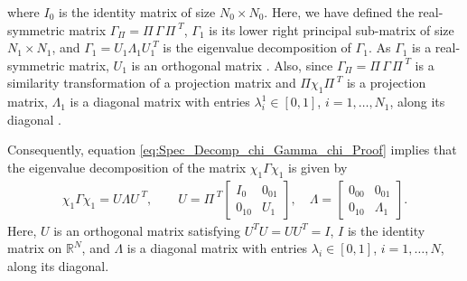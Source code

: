 \documentclass{cmslatex}
\begin{document}
%
where $I_0$ is the identity matrix of size $N_0\times N_0$. Here, we have
defined the real-symmetric matrix $\Gamma_\Pi=\Pi\,\Gamma\,\Pi^{\;T}$, $\Gamma_1$ is its
lower right principal sub-matrix of size $N_1\times N_1$, and
$\Gamma_1=U_1\Lambda_1U_1^{\;T}$ is the eigenvalue decomposition of $\Gamma_1$. As
$\Gamma_1$ is a real-symmetric matrix, $U_1$ is an orthogonal matrix
\cite{Horn_Johnson-1990}. Also, since $\Gamma_\Pi=\Pi\,\Gamma\,\Pi^{\;T}$ is a
similarity transformation of a projection matrix and $\Pi\chi_1\Pi^{\;T}$ is
a projection matrix, $\Lambda_1$ is a diagonal matrix with entries
$\lambda_i^1\in[0,1]$, $i=1,\ldots,N_1$, along its diagonal 
\cite{Horn_Johnson-1990,Demmel:1997}. 




Consequently, equation  
\eqref{eq:Spec_Decomp_chi_Gamma_chi_Proof} implies that the
eigenvalue decomposition of the matrix $\chi_1\Gamma\chi_1$ is given by 
%
\begin{align}\label{eq:Spec_Decomp_chi_Gamma_chi}
\chi_1\Gamma\chi_1=U\Lambda U^{\;T},
\qquad
U=\Pi^{\;T}\left[
  \begin{array}{ccc}
    I_0&0_{01}\\
    0_{10}&U_1   
    \end{array}
\right],
\quad
\Lambda=\left[
  \begin{array}{ccc}
    0_{00}&0_{01}\\
    0_{10}&\Lambda_1   
    \end{array}
\right].
\end{align}
%
Here, $U$ is an orthogonal matrix satisfying $U^TU=UU^T=I$, $I$ is the
identity matrix on $\mathbb{R}^N$, and $\Lambda$ is a diagonal matrix with
entries $\lambda_i\in[0,1]$, $i=1,\ldots,N$, along its diagonal.
\end{document}
